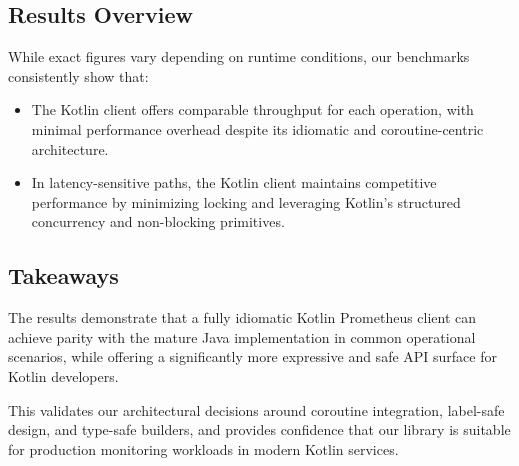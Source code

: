 \subsection*{Results Overview}

While exact figures vary depending on runtime conditions, our benchmarks consistently show that:
\begin{itemize}
    \item The Kotlin client offers comparable throughput for each operation, with minimal performance overhead despite its idiomatic and coroutine-centric architecture.
    \item In latency-sensitive paths, the Kotlin client maintains competitive performance by minimizing locking and leveraging Kotlin’s structured concurrency and non-blocking primitives.
\end{itemize}

\subsection*{Takeaways}

The results demonstrate that a fully idiomatic Kotlin Prometheus client can achieve parity with the mature Java implementation in common operational scenarios, while offering a significantly more expressive and safe API surface for Kotlin developers.

This validates our architectural decisions around coroutine integration, label-safe design, and type-safe builders, and provides confidence that our library is suitable for production monitoring workloads in modern Kotlin services.

